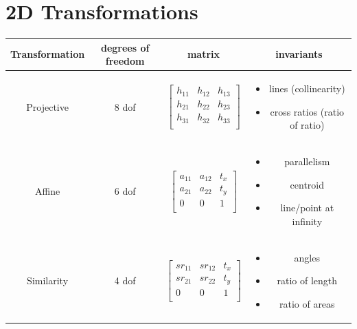 \section{2D Transformations}

\begin{tabular}{|c|c|c|c|}
 \hline
  Transformation & degrees of freedom & matrix & invariants \\
  \hline
  Projective & 8 dof & 
  $\left[\begin{array}{ccc}
       h_{11}&h_{12}&h_{13}  \\
       h_{21}&h_{22}&h_{23}  \\
       h_{31}&h_{32}&h_{33}  \\
    \end{array}\right]$ & 
    \begin{minipage}[t]{0.4\textwidth}
    \begin{itemize}
        \item lines (collinearity)  
        \item cross ratios (ratio of ratio)
    \end{itemize}
    \end{minipage}
    \\
    \hline
    
      Affine & 6 dof & 
  $\left[\begin{array}{ccc}
       a_{11}&a_{12}&t_{x}  \\
       a_{21}&a_{22}&t_{y}  \\
       0 & 0 & 1  \\
    \end{array}\right]$ & 
    \begin{minipage}[t]{0.4\textwidth}
    \begin{itemize}
        \item parallelism
        \item centroid
        \item line/point at infinity
    \end{itemize}
    \end{minipage}
    \\
    \hline
    
    Similarity & 4 dof & 
  $\left[\begin{array}{ccc}
       sr_{11}&sr_{12}&t_{x}  \\
       sr_{21}&sr_{22}&t_{y}  \\
       0 & 0 & 1  \\
    \end{array}\right]$ & 
    \begin{minipage}[t]{0.4\textwidth}
    \begin{itemize}
        \item angles
        \item ratio of length
        \item ratio of areas
    \end{itemize}
    \end{minipage}
    \\
    \hline
    

\end{tabular}
